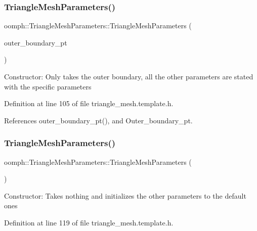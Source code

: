 \subsubsection{\texorpdfstring{Triangle\+Mesh\+Parameters()}{TriangleMeshParameters()}\hspace{0.1cm}{\footnotesize\ttfamily [2/3]}}
{\footnotesize\ttfamily oomph\+::\+Triangle\+Mesh\+Parameters\+::\+Triangle\+Mesh\+Parameters (\begin{DoxyParamCaption}\item[{\hyperlink{classoomph_1_1TriangleMeshClosedCurve}{Triangle\+Mesh\+Closed\+Curve} $\ast$}]{outer\+\_\+boundary\+\_\+pt }\end{DoxyParamCaption})\hspace{0.3cm}{\ttfamily [inline]}}

Constructor\+: Only takes the outer boundary, all the other parameters are stated with the specific parameters 

Definition at line 105 of file triangle\+\_\+mesh.\+template.\+h.



References outer\+\_\+boundary\+\_\+pt(), and Outer\+\_\+boundary\+\_\+pt.

\mbox{\label{classoomph_1_1TriangleMeshParameters_a942be2020ecd26582855d1920ce23803}} 
\subsubsection{\texorpdfstring{Triangle\+Mesh\+Parameters()}{TriangleMeshParameters()}\hspace{0.1cm}{\footnotesize\ttfamily [3/3]}}
{\footnotesize\ttfamily oomph\+::\+Triangle\+Mesh\+Parameters\+::\+Triangle\+Mesh\+Parameters (\begin{DoxyParamCaption}{ }\end{DoxyParamCaption})\hspace{0.3cm}{\ttfamily [inline]}}

Constructor\+: Takes nothing and initializes the other parameters to the default ones 

Definition at line 119 of file triangle\+\_\+mesh.\+template.\+h.

